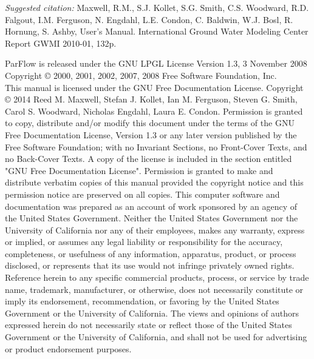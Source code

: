 
\begin{CopyrightPage}
{\em Suggested citation: }Maxwell, R.M., S.J. Kollet, S.G. Smith, C.S. Woodward, R.D. Falgout, I.M. Ferguson, N. Engdahl, L.E. Condon, C. Baldwin, W.J. Bosl, R. Hornung, S. Ashby, \parflow{} User's Manual. International Ground Water Modeling Center Report GWMI 2010-01, 132p.\newline

{ \scriptsize
\noindent ParFlow is released under the GNU LPGL License \newline
\noindent Version 1.3, 3 November 2008 \newline
\noindent Copyright \copyright{} 2000, 2001, 2002, 2007, 2008  Free Software Foundation, Inc.\newline
{}\\
This manual is licensed under the GNU Free Documentation License.\newline\vspace{1em}
Copyright \copyright{} 2014  Reed M. Maxwell, Stefan J. Kollet, Ian M. Ferguson, Steven G. Smith, Carol S. Woodward, Nicholas Engdahl, Laura E. Condon. 
Permission is granted to copy, distribute and/or modify this document
under the terms of the GNU Free Documentation License, Version 1.3
or any later version published by the Free Software Foundation; with no Invariant Sections, no Front-Cover Texts, and no Back-Cover Texts. A copy of the license is included in the section entitled "GNU Free Documentation License".
Permission is granted to make and distribute verbatim copies of this
manual provided the copyright notice and this permission notice are
preserved on all copies.\newline\vspace{0.1em}
This computer software and documentation was prepared as an account of
work sponsored by an agency of the United  States Government.  Neither
the United States Government nor the  University of California nor any
of their employees, makes any warranty, express or implied, or assumes
any legal liability  or responsibility for the accuracy, completeness,
or   usefulness of any   information,  apparatus, product, or  process
disclosed,   or represents that  its  use would not infringe privately
owned rights.  Reference  herein to any specific  commercial products,
process,   or service by   trade  name,  trademark,  manufacturer,  or
otherwise, does not  necessarily constitute or imply its  endorsement,
recommendation, or  favoring  by the  United  States Government or the
University of California.  The views and opinions of authors expressed
herein do not necessarily state or reflect those  of the United States
Government or the University of California, and shall  not be used for
advertising or product endorsement purposes.}
\end{CopyrightPage}

